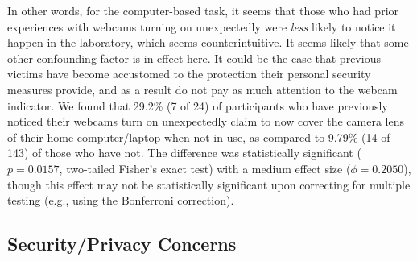 \documentclass{sigchi}
\newenvironment{packed_item}{
\begin{itemize}
  \setlength{\itemsep}{1pt}
  \setlength{\parskip}{0pt}
  \setlength{\parsep}{0pt}
}{\end{itemize}}
\begin{document}
In other words, for the computer-based task, it seems that those who had prior experiences with webcams turning on unexpectedly were {\it less} likely to notice it happen in the laboratory, which seems counterintuitive. It seems likely that some other confounding factor is in effect here. It could be the case that previous victims have become accustomed to the protection their personal security measures provide, and as a result do not pay as much attention to the webcam indicator. We found that 29.2\% (7 of 24) of participants who have previously noticed their webcams turn on unexpectedly claim to now cover the camera lens of their home computer/laptop when not in use, as compared to 9.79\% (14 of 143) of those who have not. The difference was statistically significant ($p=0.0157$, two-tailed Fisher's exact test) with a medium effect size ($\phi=0.2050$), though this effect may not be statistically significant upon correcting for multiple testing (e.g., using the Bonferroni correction).

\subsection{Security/Privacy Concerns}





\end{document}
